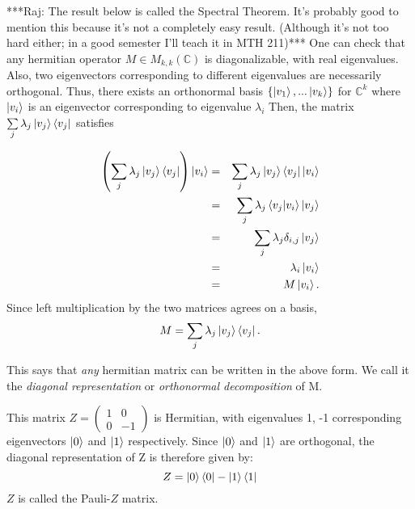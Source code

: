 ***Raj: The result below is called the Spectral Theorem. It's probably good to mention this because it's not a completely easy result. (Although it's not too hard either; in a good semester I'll teach it in MTH 211)***
One can check that any hermitian operator $M \in M_{k,k}(\mathbb{C})$ is diagonalizable, with real eigenvalues.  Also, two eigenvectors corresponding to different eigenvalues are necessarily orthogonal.  Thus, there exists an orthonormal basis $\{\ket{v_1},...\ket{v_k}\}$ for $\mathbb{C}^k$ where $\ket{v_i}$ is an eigenvector corresponding to eigenvalue $\lambda_i$  Then, the matrix $\sum\limits_j \lambda_j \ket{v_j}\bra{v_j}$ satisfies

\begin{eqnarray}
\left(\sum\limits_j \lambda_j\ket{v_j}\bra{v_j}\right)\ket{v_i}&=&\sum\limits_j \lambda_j\ket{v_j}\bra{v_j}\ket{v_i}\\
&=&\sum\limits_j \lambda_j\braket{v_j|v_i}\ket{v_j}\\
&=&\sum\limits_j \lambda_j\delta_{i,j}\ket{v_j}\\
&=&\lambda_i\ket{v_i}\\
&=&M\ket{v_i}.
\end{eqnarray}
Since left multiplication by the two matrices agrees on a basis,
\begin{equation}
M=\sum\limits_j \lambda_j \ket{v_j}\bra{v_j}.    
\end{equation}

This says that {\emph{any}} hermitian matrix can be written in the above form. We call it the \textit{diagonal representation} or \textit{orthonormal decomposition} of M.
\begin{example} \label{example-pauli z diagonal rep}
This matrix $Z=\left(\begin{smallmatrix}
    1 & 0\\
    0 & -1
    \end{smallmatrix}\right)$
    is Hermitian, with eigenvalues 1, -1 corresponding eigenvectors $\ket{0}$ and  $\ket{1}$ respectively.  Since $\ket{0}$ and $\ket{1}$ are orthogonal, the diagonal representation of Z is therefore given by:
\begin{equation}
    Z=\ket{0}\bra{0}-\ket{1}\bra{1}
\end{equation}
$Z$ is called the Pauli-$Z$ matrix.
\end{example}

